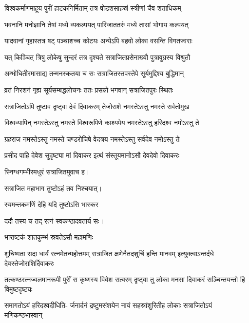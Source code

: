 \twolineshloka
{विश्वकर्माणमाहूय पुरीं हाटकनिर्मिताम्}
{तत्र षोडशसाहस्रं स्त्रीणां चैव शताधिकम्}%

\twolineshloka
{भवनानि मनोज्ञानि तेषां मध्ये व्यकल्पयत्}
{पारिजाततरुं मध्ये तासां भोगाय कल्पयत्}%

\twolineshloka
{यादवानां गृहास्तत्र षट् पञ्चाशच्च कोटयः}
{अन्येऽपि बहवो लोका वसन्ति विगतज्वराः}%

\twolineshloka
{यत् किञ्चित् त्रिषु लोकेषु सुन्दरं तत्र दृश्यते}
{सत्राजितप्रसेनाख्यौ पुत्रावुग्रस्य विश्रुतौ}%

\twolineshloka
{अम्भोधितीरमासाद्य तन्मनस्कतया च सः}
{सत्राजितस्तपस्तेपे सूर्यमुद्दिश्य बुद्धिमान्}%

\twolineshloka
{व्रतं निरशनं गृह्य सूर्यसम्बद्धलोचनः}
{ततः प्रसन्नो भगवान् सत्राजितपुरः स्थितः}%

\twolineshloka
{सत्राजितोऽपि तुष्टाव दृष्ट्वा देवं दिवाकरम्}
{तेजोराशे नमस्तेऽस्तु नमस्ते सर्वतोमुख}%

\twolineshloka
{विश्वव्यापिन् नमस्तेऽस्तु नमस्ते विश्वरूपिणे}
{काश्यपेय नमस्तेऽस्तु हरिदश्व नमोऽस्तु ते}%

\twolineshloka
{ग्रहराज नमस्तेऽस्तु नमस्ते चण्डरोचिषे}
{वेदत्रय नमस्तेऽस्तु सर्वदेव नमोऽस्तु ते}%

\twolineshloka
{प्रसीद पाहि देवेश सुदृष्ट्या मां दिवाकर}
{इत्थं संस्तूयमानोऽसौ देवदेवो दिवाकरः}%

{स्निग्धगम्भीरमधुरं सत्राजितमुवाच ह।}



{सत्राजित महाभाग तुष्टोऽहं तव निश्चयात्।}


\onelineshloka
{स्यमन्तकमणिं देहि यदि तुष्टोऽसि भास्कर}%

{ददौ तस्य च तद् रत्नं स्वकण्ठादवतार्य सः।}

\onelineshloka
{भाराष्टकं शातकुम्भं स्रवतेऽसौ महामणिः}%

\threelineshloka
{शुचिष्मता सदा धार्यं रत्नमेतन्महोत्तमम्}
{सत्राजित क्षणेनैतदशुचिं हन्ति मानवम्}
{इत्युक्त्वाऽन्तर्दधे देवस्तेजोराशिर्दिवाकरः}%

\fourlineindentedshloka
{तत्कण्ठरत्नज्वलमानरूपी}
{पुरीं स कृष्णस्य विवेश सत्वरम्} 
{दृष्ट्वा तु लोका मनसा दिवाकरं}
{सञ्चिन्तयन्तो हि विमुष्टदृष्टयः}%

\fourlineindentedshloka
{समागतोऽयं हरिदश्वदीधिति-}
{र्जनार्दनं द्रष्टुमसंशयेन} 
{नायं सहस्रांशुरितीह लोकाः}
{सत्राजितोऽयं मणिकण्ठभास्वान्}%

